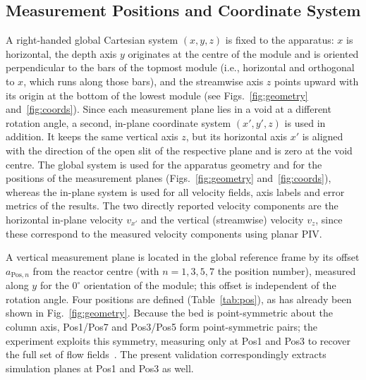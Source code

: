 \subsection{Measurement Positions and Coordinate System}
\label{sec:geometry:coords}
A right-handed global Cartesian system $(x,y,z)$ is fixed to the apparatus: $x$ is horizontal, the depth axis $y$ originates at the centre of the module and is oriented perpendicular to the bars of the topmost module (i.e., horizontal and orthogonal to $x$, which runs along those bars), and the streamwise axis $z$ points upward with its origin at the bottom of the lowest module (see Figs.~\ref{fig:geometry} and~\ref{fig:coords}). Since each measurement plane lies in a void at a different rotation angle, a second, in-plane coordinate system $(x',y',z)$ is used in addition. It keeps the same vertical axis $z$, but its horizontal axis $x'$ is aligned with the direction of the open slit of the respective plane and is zero at the void centre. The global system is used for the apparatus geometry and for the positions of the measurement planes (Figs.~\ref{fig:geometry} and~\ref{fig:coords}), whereas the in-plane system is used for all velocity fields, axis labels and error metrics of the results. The two directly reported velocity components are the horizontal in-plane velocity $v_{x'}$ and the vertical (streamwise) velocity $v_z$, since these correspond to the measured velocity components using planar PIV.

A vertical measurement plane is located in the global reference frame by its offset $a_{\mathrm{Pos},n}$ from the reactor centre (with $n=1,3,5,7$ the position number), measured along $y$ for the $0^\circ$ orientation of the module; this offset is independent of the rotation angle. Four positions are defined (Table~\ref{tab:pos}), as has already been shown in Fig.~\ref{fig:geometry}. Because the bed is point-symmetric about the column axis, Pos1/Pos7 and Pos3/Pos5 form point-symmetric pairs; the experiment exploits this symmetry, measuring only at Pos1 and Pos3 to recover the full set of flow fields~\cite{velten2026}. The present validation correspondingly extracts simulation planes at Pos1 and Pos3 as well.

